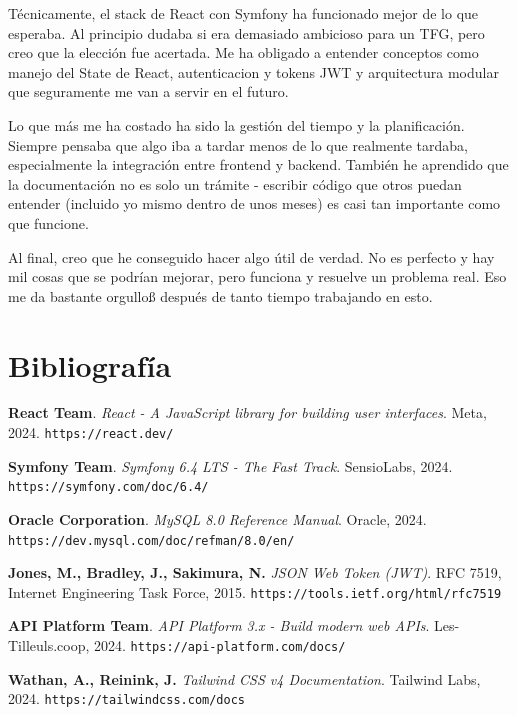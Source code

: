 \documentclass[12pt,a4paper,oneside]{report}
\begin{document}
Técnicamente, el stack de React con Symfony ha funcionado mejor de lo que esperaba. Al principio dudaba si era demasiado ambicioso para un TFG, pero creo que la elección fue acertada. Me ha obligado a entender conceptos como manejo del State de React, autenticacion y tokens JWT y arquitectura modular que seguramente me van a servir en el futuro.

Lo que más me ha costado ha sido la gestión del tiempo y la planificación. Siempre pensaba que algo iba a tardar menos de lo que realmente tardaba, especialmente la integración entre frontend y backend. También he aprendido que la documentación no es solo un trámite - escribir código que otros puedan entender (incluido yo mismo dentro de unos meses) es casi tan importante como que funcione.

Al final, creo que he conseguido hacer algo útil de verdad. No es perfecto y hay mil cosas que se podrían mejorar, pero funciona y resuelve un problema real. Eso me da bastante orgulloß después de tanto tiempo trabajando en esto.

\newpage
\thispagestyle{empty}
\mbox{}

\newpage

\chapter*{Bibliografía}

\noindent
[1] \textbf{React Team}. \textit{React - A JavaScript library for building user interfaces}. Meta, 2024. \texttt{https://react.dev/}

\noindent
[2] \textbf{Symfony Team}. \textit{Symfony 6.4 LTS - The Fast Track}. SensioLabs, 2024. \texttt{https://symfony.com/doc/6.4/}

\noindent
[3] \textbf{Oracle Corporation}. \textit{MySQL 8.0 Reference Manual}. Oracle, 2024. \texttt{https://dev.mysql.com/doc/refman/8.0/en/}

\noindent
[4] \textbf{Jones, M., Bradley, J., Sakimura, N.} \textit{JSON Web Token (JWT)}. RFC 7519, Internet Engineering Task Force, 2015. \texttt{https://tools.ietf.org/html/rfc7519}

\noindent
[5] \textbf{API Platform Team}. \textit{API Platform 3.x - Build modern web APIs}. Les-Tilleuls.coop, 2024. \texttt{https://api-platform.com/docs/}

\noindent
[6] \textbf{Wathan, A., Reinink, J.} \textit{Tailwind CSS v4 Documentation}. Tailwind Labs, 2024. \texttt{https://tailwindcss.com/docs}
\end{document}
